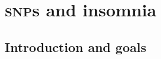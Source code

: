 \documentclass[\ifafour a4paper,12pt,\else a5paper,10pt,\fi%
onecolumn,oneside,article,%
british%
]{memoir}
\title{\propertitle}
\author{%
\hspace*{\stretch{1}}%
\parbox{0.5\linewidth}%
{\protect\centering D. Bragantini\\%
\footnotesize\epost{\email{daniela.bragantini}{ntnu.no}}}%
\hspace*{\stretch{1}}%
\parbox{0.5\linewidth}%
{\protect\centering P.G.L. Porta Mana\\%
\footnotesize\epost{\email{piero.mana}{ntnu.no}}}%
\hspace*{\stretch{1}}%
\\[\jot]\hspace*{\stretch{1}}%
\parbox{0.5\linewidth}%
{\protect\centering C. G\"uzey\\%
\footnotesize\epost{\email{cuneyt.guzey}{ntnu.no}}}%
\hspace*{\stretch{1}}%
\parbox{0.5\linewidth}%
{\protect\centering Y. Roudi\\%
\footnotesize\epost{\email{yasser.roudi}{ntnu.no}}}%
\hspace*{\stretch{1}}%
}
\date{\firstpublished; updated \updated}
\theoremstyle{remark}
\theoremstyle{innote}
\newcommand*{\amp}{\&}
\newcommand*{\asudedication}[1]{%
{\par\centering\textit{#1}\par}}
\renewcommand*{\|}[1][]{\nonscript\,#1\vert\nonscript\;\mathopen{}}
\newcommand*{\snp}{\textsc{snp}}
\begin{document}
\captiondelim{\quad}\captionnamefont{\footnotesize}\captiontitlefont{\footnotesize}
\frenchspacing
\maketitle

\abstractrunin
\abslabeldelim{}
\renewcommand*{\abstractname}{}
\setlength{\absleftindent}{0pt}
\setlength{\absrightindent}{0pt}
\setlength{\abstitleskip}{-\absparindent}
\begin{abstract}%
  \noindent ***
\\\noindent\emph{\footnotesize Note: Dear Reader
    \amp\ Peer, this manuscript is being peer-reviewed by you. Thank you.}
\end{abstract}
\frenchspacing





\section{\snp s and insomnia}
\label{sec:intro}

\subsection{Introduction and goals}
\label{sec:intro_goals}
\end{document}
